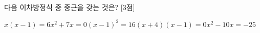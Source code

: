 다음 이차방정식 중 중근을 갖는 것은? \mbox{[3점]}
\begin{choicesii}{$x(x-1)=6$}{$x^2+7x=0$}{$(x-1)^2=16$}{$(x+4)(x-1)=0$}{$x^2-10x=-25$}\end{choicesii}

